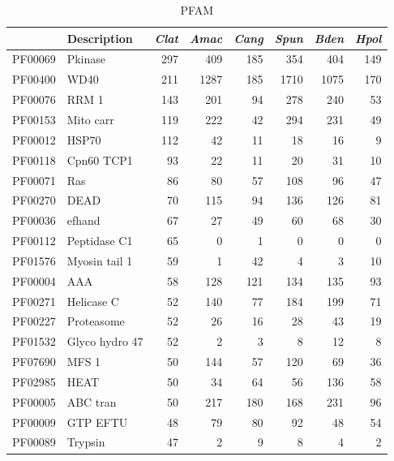 
\begin{table}[tbp]
\centering
\begin{tabular}{rlrrrrrr}
  \hline
\hline
 & Description & \emph{Clat} & \emph{Amac} & \emph{Cang} & \emph{Spun} & \emph{Bden} & \emph{Hpol} \\ 
  \hline
PF00069 & Pkinase & 297 & 409 & 185 & 354 & 404 & 149 \\ 
  PF00400 & WD40 & 211 & 1287 & 185 & 1710 & 1075 & 170 \\ 
  PF00076 & RRM 1 & 143 & 201 &  94 & 278 & 240 &  53 \\ 
  PF00153 & Mito carr & 119 & 222 &  42 & 294 & 231 &  49 \\ 
  PF00012 & HSP70 & 112 &  42 &  11 &  18 &  16 &   9 \\ 
  PF00118 & Cpn60 TCP1 &  93 &  22 &  11 &  20 &  31 &  10 \\ 
  PF00071 & Ras &  86 &  80 &  57 & 108 &  96 &  47 \\ 
  PF00270 & DEAD &  70 & 115 &  94 & 136 & 126 &  81 \\ 
  PF00036 & efhand &  67 &  27 &  49 &  60 &  68 &  30 \\ 
  PF00112 & Peptidase C1 &  65 &   0 &   1 &   0 &   0 &   0 \\ 
  PF01576 & Myosin tail 1 &  59 &   1 &  42 &   4 &   3 &  10 \\ 
  PF00004 & AAA &  58 & 128 & 121 & 134 & 135 &  93 \\ 
  PF00271 & Helicase C &  52 & 140 &  77 & 184 & 199 &  71 \\ 
  PF00227 & Proteasome &  52 &  26 &  16 &  28 &  43 &  19 \\ 
  PF01532 & Glyco hydro 47 &  52 &   2 &   3 &   8 &  12 &   8 \\ 
  PF07690 & MFS 1 &  50 & 144 &  57 & 120 &  69 &  36 \\ 
  PF02985 & HEAT &  50 &  34 &  64 &  56 & 136 &  58 \\ 
  PF00005 & ABC tran &  50 & 217 & 180 & 168 & 231 &  96 \\ 
  PF00009 & GTP EFTU &  48 &  79 &  80 &  92 &  48 &  54 \\ 
  PF00089 & Trypsin &  47 &   2 &   9 &   8 &   4 &   2 \\ 
   \hline
\hline
\end{tabular}
\caption{PFAM} 
\label{tab:ChClat_PFAM}
\end{table}
